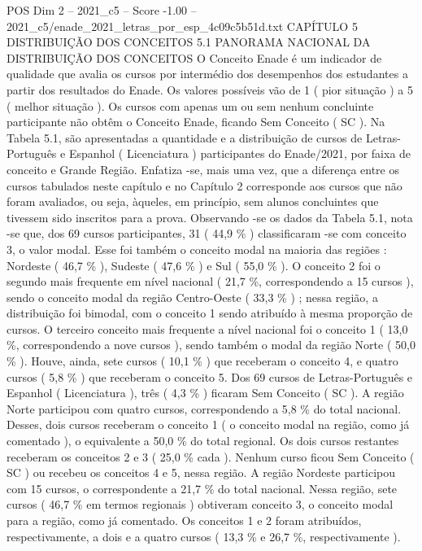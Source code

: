 \begin{textsample}{POS Dim 2 – 2021\_c5 – Score -1.00 – 2021\_c5/enade\_2021\_letras\_por\_esp\_4c09c5b51d.txt}  \label{ex:f2_pos_289}
CAPÍTULO 5 DISTRIBUIÇÃO DOS CONCEITOS 5.1 PANORAMA NACIONAL DA DISTRIBUIÇÃO DOS CONCEITOS O Conceito Enade é um indicador de qualidade que avalia os cursos por intermédio dos desempenhos dos estudantes a partir dos resultados do Enade.
Os valores possíveis vão de 1 ( pior situação ) a 5 ( melhor situação ).
Os cursos com apenas um ou sem nenhum concluinte participante não obtêm o Conceito Enade, ficando Sem Conceito ( SC ).
Na Tabela 5.1, são apresentadas a quantidade e a distribuição de cursos de Letras-Português e Espanhol ( Licenciatura ) participantes do Enade/2021, por faixa de conceito e Grande Região.
Enfatiza -se, mais uma vez, que a diferença entre os cursos tabulados neste capítulo e no Capítulo 2 corresponde aos cursos que não foram avaliados, ou seja, àqueles, em princípio, sem alunos concluintes que tivessem sido inscritos para a prova.
Observando -se os dados da Tabela 5.1, nota -se que, dos 69 cursos participantes, 31 ( 44,9 \% ) classificaram -se com conceito 3, o valor modal.
Esse foi também o conceito modal na maioria das regiões : Nordeste ( 46,7 \% ), Sudeste ( 47,6 \% ) e Sul ( 55,0 \% ).
O conceito 2 foi o segundo mais frequente em nível nacional ( 21,7 \%, correspondendo a 15 cursos ), sendo o conceito modal da região Centro-Oeste ( 33,3 \% ) ; nessa região, a distribuição foi bimodal, com o conceito 1 sendo atribuído à mesma proporção de cursos.
O terceiro conceito mais frequente a nível nacional foi o conceito 1 ( 13,0 \%, correspondendo a nove cursos ), sendo também o modal da região Norte ( 50,0 \% ).
Houve, ainda, sete cursos ( 10,1 \% ) que receberam o conceito 4, e quatro cursos ( 5,8 \% ) que receberam o conceito 5.
Dos 69 cursos de Letras-Português e Espanhol ( Licenciatura ), três ( 4,3 \% ) ficaram Sem Conceito ( SC ).
A região Norte participou com quatro cursos, correspondendo a 5,8 \% do total nacional.
Desses, dois cursos receberam o conceito 1 ( o conceito modal na região, como já comentado ), o equivalente a 50,0 \% do total regional.
Os dois cursos restantes receberam os conceitos 2 e 3 ( 25,0 \% cada ).
Nenhum curso ficou Sem Conceito ( SC ) ou recebeu os conceitos 4 e 5, nessa região.
A região Nordeste participou com 15 cursos, o correspondente a 21,7 \% do total nacional.
Nessa região, sete cursos ( 46,7 \% em termos regionais ) obtiveram conceito 3, o conceito modal para a região, como já comentado.
Os conceitos 1 e 2 foram atribuídos, respectivamente, a dois e a quatro cursos ( 13,3 \% e 26,7 \%, respectivamente ).

\end{textsample}
